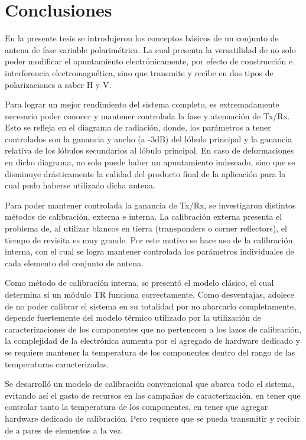 \section{Conclusiones}

En la presente tesis se introdujeron los conceptos básicos de un conjunto de antena de fase variable polarimétrica. La cual 
presenta la versatilidad de no solo poder modificar el apuntamiento electrónicamente, por efecto de construcción e interferencia 
electromagnética, sino que transmite y recibe en dos tipos de polarizaciones a saber H y V.

Para lograr un mejor rendimiento del sistema completo, es extremadamente necesario poder conocer y mantener controlada la fase 
y atenuación de Tx/Rx. Esto se refleja en el diagrama de radiación, donde, los parámetros a tener controlados son la ganancia
y ancho (a -3dB) del lóbulo principal y la ganancia relativa de los lóbulos secundarios al lóbulo principal. En caso de 
deformaciones en dicho diagrama, no solo puede haber un apuntamiento indeseado, sino que se disminuye drásticamente la calidad 
del producto final de la aplicación para la cual pudo haberse utilizado dicha antena.

Para poder mantener controlada la ganancia de Tx/Rx, se investigaron distintos métodos de calibración, externa e interna. La 
calibración externa presenta el problema de, al utilizar blancos en tierra (transponders o corner reflectors), el tiempo de 
revisita es muy grande. Por este motivo se hace uso de la calibración interna, con el cual se logra mantener controlada 
los parámetros individuales de cada elemento del conjunto de antena. 

Como método de calibración interna, se presentó el modelo clásico, el cual determina si un módulo TR funciona correctamente. 
Como desventajas, adolece de no poder calibrar el sistema en su totalidad por no abarcarlo completamente, depende fuertemente del
modelo térmico utilizado por la utilización de caracterizaciones de los componentes que no pertenecen a los lazos de calibración, 
la complejidad de la electrónica aumenta por el agregado de hardware dedicado y se requiere mantener la temperatura de los 
componentes dentro del rango de las temperaturas caracterizadas.

Se desarrolló un modelo de calibración convencional que abarca todo el sistema, evitando así el gasto de recursos en las 
campañas de caracterización, en tener que controlar tanto la temperatura de los componentes, en tener que agregar hardware 
dedicado de calibración. Pero requiere que se pueda transmitir y recibir de a pares de elementos a la vez. 

